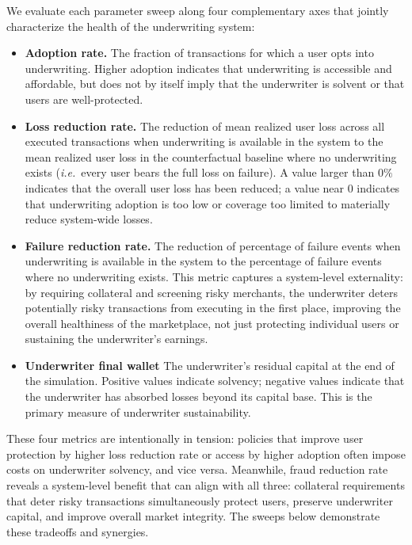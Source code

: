 \documentclass{article} %
\begin{document}
We evaluate each parameter sweep along four complementary axes that jointly characterize the health of the underwriting system:

\begin{itemize}
\item \textbf{Adoption rate.} The fraction of transactions for which a user opts into underwriting. Higher adoption indicates that underwriting is accessible and affordable, but does not by itself imply that the underwriter is solvent or that users are well-protected.


\item \textbf{Loss reduction rate.} The reduction of mean realized user loss across all executed transactions when underwriting is available in the system to the mean realized user loss in the counterfactual baseline where no underwriting exists (\emph{i.e.}\ every user bears the full loss on failure). A value larger than $0\%$ indicates that the overall user loss has been reduced; a value near $0$ indicates that underwriting adoption is too low or coverage too limited to materially reduce system-wide losses.

\item \textbf{Failure reduction rate.} The reduction of percentage of failure events when underwriting is available in the system to the percentage of failure events where no underwriting exists. This metric captures a system-level externality: by requiring collateral and screening risky merchants, the underwriter deters potentially risky transactions from executing in the first place, improving the overall healthiness of the marketplace, not just protecting individual users or sustaining the underwriter's earnings.

\item \textbf{Underwriter final wallet} The underwriter's residual capital at the end of the simulation. Positive values indicate solvency; negative values indicate that the underwriter has absorbed losses beyond its capital base. This is the primary measure of underwriter sustainability.
\end{itemize}

These four metrics are intentionally in tension: policies that improve user protection by higher loss reduction rate or access by higher adoption often impose costs on underwriter solvency, and vice versa. Meanwhile, fraud reduction rate reveals a system-level benefit that can align with all three: collateral requirements that deter risky transactions simultaneously protect users, preserve underwriter capital, and improve overall market integrity. The sweeps below demonstrate these tradeoffs and synergies.
\end{document}
